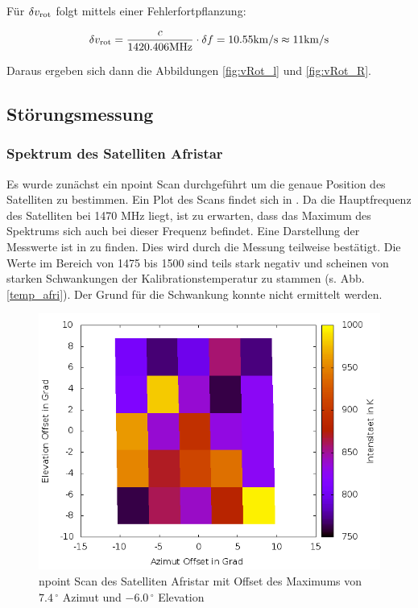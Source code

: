 Für $\delta v_{\mathrm{rot}}$ folgt mittels einer Fehlerfortpflanzung:

\begin{equation}
\delta v_{\mathrm{rot}} = \frac{c}{1420.406 \mathrm{MHz}} \cdot \delta f = 10.55 \mathrm{km/s} \approx 11 \mathrm{km/s}
\end{equation}

Daraus ergeben sich dann die Abbildungen \ref{fig:vRot_l} und \ref{fig:vRot_R}.

\subsection{Störungsmessung}
\subsubsection{Spektrum des Satelliten Afristar}
Es wurde zunächst ein npoint Scan durchgeführt um die genaue Position des Satelliten zu bestimmen. Ein Plot des Scans findet sich in .
Da die Hauptfrequenz des Satelliten bei 1470 MHz liegt, ist zu erwarten, dass das Maximum des Spektrums sich auch bei dieser Frequenz befindet. Eine Darstellung der Messwerte ist in  zu finden. Dies wird durch die Messung teilweise bestätigt. Die Werte im Bereich von 1475 bis 1500 sind teils stark negativ und scheinen von starken Schwankungen der Kalibrationstemperatur zu stammen (s. Abb. \ref{temp_afri}). Der Grund für die Schwankung konnte nicht ermittelt werden.
\begin{figure}
\includegraphics[width=.8\textwidth]{images/npoint_afri_color}
\caption{npoint Scan des Satelliten Afristar mit Offset des  Maximums von $7.4\,^\circ$ Azimut und $-6.0\,^\circ$ Elevation}
\label{npoint_afri}
\end{figure}
